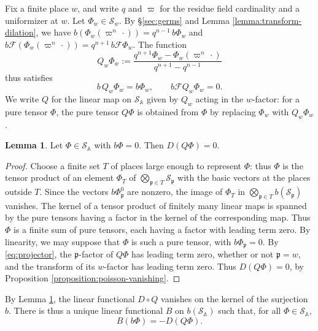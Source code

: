 \documentclass[reqno]{amsart}
\theoremstyle{plain}
\theoremstyle{definition}
\theoremstyle{itplain}
\newtheorem{lemma}[theorem]{Lemma}
\numberwithin{equation}{section}
\numberwithin{theorem}{section}
\begin{document}
Fix a finite place $w$, and write $q$ and $\varpi$ for the residue field cardinality and a uniformizer at $w$.  Let $\Phi_w \in \mathcal{S}_w$.  By \S\ref{sec:germs} and Lemma \ref{lemma:transform-dilation}, we have $b (\Phi_w(\varpi^n \, \cdot)) = q^{n-1} \, b \Phi_w$ and $b \mathcal{F} (\Phi_w(\varpi^n \, \cdot)) = q^{n+1} \, b \mathcal{F} \Phi_w$.  The function
\begin{equation*}
  Q_w \Phi_w := \frac{q^{n+1} \Phi_w - \Phi_w(\varpi^n \, \cdot)}{q^{n+1} - q^{n-1}}
\end{equation*}
thus satisfies
\begin{equation}\label{eq:projector}
  b \, Q_w \Phi_w = b \Phi_w,
  \qquad
  b \mathcal{F} Q_w \Phi_w = 0.
\end{equation}
We write $Q$ for the linear map on $\mathcal{S}_{\mathbb{A}}$ given by $Q_w$ acting in the $w$-factor: for a pure tensor $\Phi$, the pure tensor $Q \Phi$ is obtained from $\Phi$ by replacing $\Phi_w$ with $Q_w \Phi_w$.

\begin{lemma}\label{lemma:boundary-well-defined}
  Let $\Phi \in \mathcal{S}_{\mathbb{A}}$ with $b \Phi = 0$.  Then $D(Q \Phi) = 0$.
\end{lemma}
\begin{proof}
  Choose a finite set $T$ of places large enough to represent $\Phi$: thus $\Phi$ is the tensor product of an element $\Phi_T$ of $\bigotimes_{\mathfrak{p} \in T} \mathcal{S}_{\mathfrak{p}}$ with the basic vectors at the places outside $T$.  Since the vectors $b \Phi_{\mathfrak{p}}^0$ are nonzero, the image of $\Phi_T$ in $\bigotimes_{\mathfrak{p} \in T} b(\mathcal{S}_{\mathfrak{p}})$ vanishes.  The kernel of a tensor product of finitely many linear maps is spanned by the pure tensors having a factor in the kernel of the corresponding map.  Thus $\Phi$ is a finite sum of pure tensors, each having a factor with leading term zero.  By linearity, we may suppose that $\Phi$ is such a pure tensor, with $b \Phi_{\mathfrak{p}} = 0$.  By \eqref{eq:projector}, the $\mathfrak{p}$-factor of $Q \Phi$ has leading term zero, whether or not $\mathfrak{p} = w$, and the transform of its $w$-factor has leading term zero.  Thus $D(Q \Phi) = 0$, by Proposition \ref{proposition:poisson-vanishing}.
\end{proof}

By Lemma \ref{lemma:boundary-well-defined}, the linear functional $D \circ Q$ vanishes on the kernel of the surjection $b$.  There is thus a unique linear functional $B$ on $b(\mathcal{S}_{\mathbb{A}})$ such that, for all $\Phi \in \mathcal{S}_{\mathbb{A}}$,
\begin{equation*}
  B(b \Phi) = - D(Q \Phi).
\end{equation*}
\end{document}

